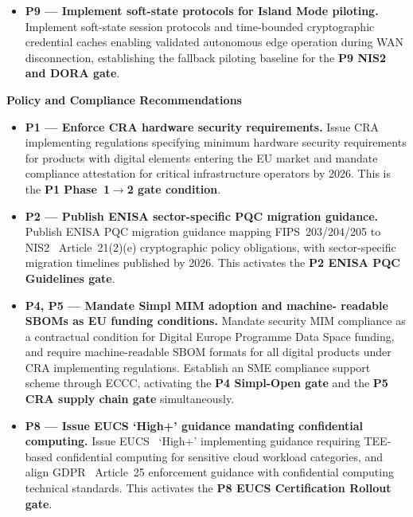 \documentclass{ieeeaccess}
\begin{document}
\begin{itemize}
    \item \textbf{P9 --- Implement soft-state protocols for Island
    Mode piloting.}
    Implement soft-state session protocols and time-bounded
    cryptographic credential caches enabling validated autonomous edge
    operation during WAN disconnection, establishing the fallback
    piloting baseline for the \textbf{P9 NIS2 and DORA gate}.

\end{itemize}

\textbf{Policy and Compliance Recommendations}

\begin{itemize}

    \item \textbf{P1 --- Enforce CRA hardware security requirements.}
    Issue CRA~\cite{cra} implementing regulations specifying minimum
    hardware security requirements for products with digital elements
    entering the EU market and mandate compliance attestation for
    critical infrastructure operators by 2026. This is the
    \textbf{P1 Phase~1$\to$2 gate condition}.

    \item \textbf{P2 --- Publish ENISA sector-specific PQC migration
    guidance.}
    Publish ENISA PQC migration guidance mapping FIPS~203/204/205 to
    NIS2~\cite{nis2} Article~21(2)(e) cryptographic policy obligations,
    with sector-specific migration timelines published by 2026.
    This activates the \textbf{P2 ENISA PQC Guidelines gate}.

    \item \textbf{P4, P5 --- Mandate Simpl MIM adoption and machine-
    readable SBOMs as EU funding conditions.}
    Mandate security MIM compliance as a contractual condition for
    Digital Europe Programme Data Space funding, and require
    machine-readable SBOM formats for all digital products under CRA
    implementing regulations. Establish an SME compliance support
    scheme through ECCC, activating the \textbf{P4 Simpl-Open gate}
    and the \textbf{P5 CRA supply chain gate} simultaneously.

    \item \textbf{P8 --- Issue EUCS `High+' guidance mandating
    confidential computing.}
    Issue EUCS~\cite{eucs} `High+' implementing guidance requiring
    TEE-based confidential computing for sensitive cloud workload
    categories, and align GDPR~\cite{gdpr} Article~25 enforcement
    guidance with confidential computing technical standards.
    This activates the \textbf{P8 EUCS Certification Rollout gate}.


\end{itemize}
\end{document}
